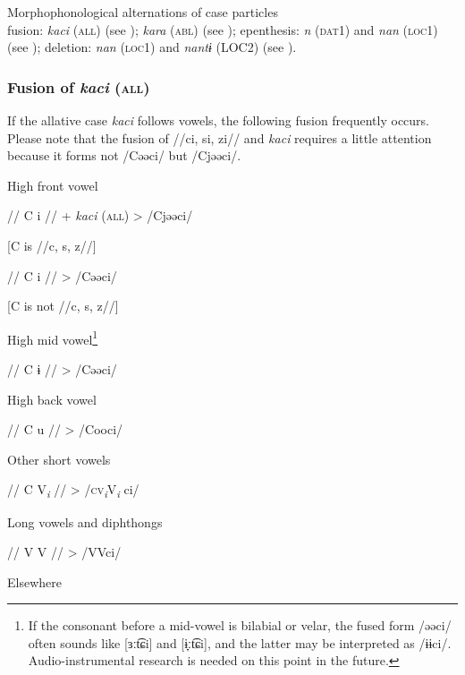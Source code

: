 \begin{table}
\ea\label{ex:6-30} Morphophonological alternations of case particles\\
    \ea fusion:         \textit{kaci} (\textsc{all}) (see ); \textit{kara} (\textsc{abl}) (see );
    \ex epenthesis:         \textit{n} (\textsc{dat}1) and \textit{nan} (\textsc{loc}1) (see );
    \ex deletion:         \textit{nan} (\textsc{loc}1) and \textit{nantɨ} (LOC2) (see ).
    \z
\z

\subsubsection{Fusion of \textit{kaci} (\textsc{all})}
\label{bkm:Ref365151806}
If the allative case \textit{kaci} follows vowels, the following fusion frequently occurs. Please note that the fusion of //ci, si, zi// and \textit{kaci} requires a little attention because it forms not /Cəəci/ but /Cjəəci/.

\ea\label{ex:6-31}
 \ea High front vowel\\
\gll

    //  C  i  //  +  \textit{kaci} (\textsc{all})  >  /Cjəəci/

    [C is //c, s, z//]

    //  C  i  //      >  /Cəəci/

    [C is not //c, s, z//]

\ex High mid vowel\footnote{If the consonant before a mid-vowel is bilabial or velar, the fused form /əəci/ often sounds like [ɜːt͡ɕi] and [ɨ̞ːt͡ɕi], and the latter may be interpreted as /ɨɨci/. Audio-instrumental research is needed on this point in the future.}\\
\gll

    //  C  ɨ  //      >  /Cəəci/

\ex High back vowel\\
\gll

    //  C  u  //      >  /Cooci/

\ex Other short vowels\\
\gll

    //  C  V\textit{\textsubscript{i}}  //      >  /\textsc{cv}\textit{\textsubscript{i}}V\textit{\textsubscript{i} }ci/

\ex Long vowels and diphthongs\\
\gll

    //  V  V  //      >  /VVci/

\ex  Elsewhere\\


\end{table}
